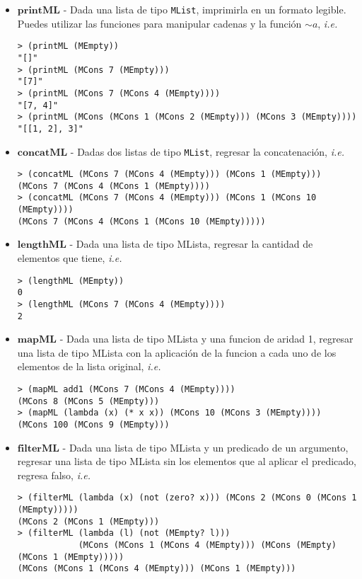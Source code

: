 \documentclass{article}
\begin{document}
\begin{itemize}
\item $\textbf{printML}$ - Dada una lista de tipo \texttt{MList},
  imprimirla en un formato legible. Puedes utilizar las funciones para
  manipular cadenas y la función \texttt{$\sim a$}, \textit{i.e.}
\begin{verbatim}
> (printML (MEmpty))
"[]"
> (printML (MCons 7 (MEmpty)))
"[7]"
> (printML (MCons 7 (MCons 4 (MEmpty))))
"[7, 4]"
> (printML (MCons (MCons 1 (MCons 2 (MEmpty))) (MCons 3 (MEmpty))))
"[[1, 2], 3]"
\end{verbatim}

\item $\textbf{concatML}$ - Dadas dos listas de tipo \texttt{MList},
  regresar la concatenación, \textit{i.e.}
\begin{verbatim}
> (concatML (MCons 7 (MCons 4 (MEmpty))) (MCons 1 (MEmpty)))
(MCons 7 (MCons 4 (MCons 1 (MEmpty))))
> (concatML (MCons 7 (MCons 4 (MEmpty))) (MCons 1 (MCons 10 (MEmpty))))
(MCons 7 (MCons 4 (MCons 1 (MCons 10 (MEmpty)))))
\end{verbatim}

\item $\textbf{lengthML}$ - Dada una lista de tipo MLista, regresar la
  cantidad de elementos que tiene, \textit{i.e.}
\begin{verbatim}
> (lengthML (MEmpty))
0
> (lengthML (MCons 7 (MCons 4 (MEmpty))))
2
\end{verbatim}

\item $\textbf{mapML}$ - Dada una lista de tipo MLista y una funcion de aridad 1,
  regresar una lista de tipo MLista con la aplicación de la funcion a cada uno de
  los elementos de la lista original, \textit{i.e.}
\begin{verbatim}
> (mapML add1 (MCons 7 (MCons 4 (MEmpty))))
(MCons 8 (MCons 5 (MEmpty)))
> (mapML (lambda (x) (* x x)) (MCons 10 (MCons 3 (MEmpty))))
(MCons 100 (MCons 9 (MEmpty)))
\end{verbatim}

\newpage

\item $\textbf{filterML}$ - Dada una lista de tipo MLista y un predicado de un
  argumento, regresar una lista de tipo MLista sin los elementos que al aplicar
  el predicado, regresa falso, \textit{i.e.}
\begin{verbatim}
> (filterML (lambda (x) (not (zero? x))) (MCons 2 (MCons 0 (MCons 1 (MEmpty)))))
(MCons 2 (MCons 1 (MEmpty)))
> (filterML (lambda (l) (not (MEmpty? l)))
            (MCons (MCons 1 (MCons 4 (MEmpty))) (MCons (MEmpty) (MCons 1 (MEmpty)))))
(MCons (MCons 1 (MCons 4 (MEmpty))) (MCons 1 (MEmpty)))
\end{verbatim}


\end{itemize}
\end{document}
